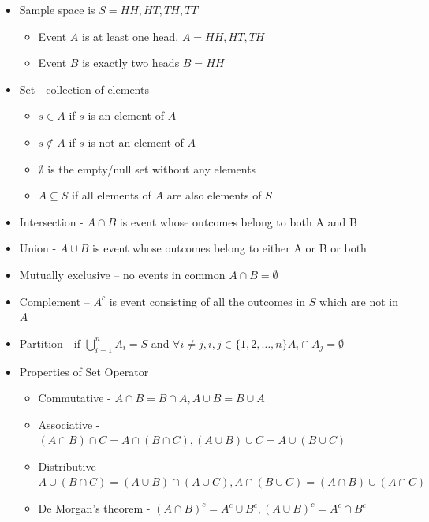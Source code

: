 \documentclass{article}
\begin{document}
\begin{itemize}
\begin{itemize}
        \item Any individual outcome, any subset of or the entire sample space
	   \item Said to occur if the realized outcome of the experiment is in A
    \end{itemize}
    \item Sample space is $S={HH,HT,TH,TT}$
    \begin{itemize}
        \item Event $A$ is at least one head, $A={HH,HT,TH}$
	   \item Event $B$ is exactly two heads $B={HH}$
    \end{itemize}
    \item Set - collection of elements
    \begin{itemize}
        \item $s \in A$ if $s$ is an element of $A$
        \item $s \notin A$ if $s$ is not an element of $A$
        \item $\emptyset$ is the empty/null set without any elements
        \item $A \subseteq S$ if all elements of $A$ are also elements of $S$
    \end{itemize}
    \item Intersection - $A \cap B$ is event whose outcomes belong to both A and B
    \item Union - $A \cup B$ is event whose outcomes belong to either A or B or both
    \item Mutually exclusive – no events in common $A \cap B=\emptyset$
    \item Complement – $A^c$ is event consisting of all the outcomes in $S$ which are not in $A$
    \item Partition - if $\bigcup_{i=1}^n A_i=S$ and $\forall i\neq j, i,j \in \{ 1,2, \dots , n \} A_i \cap A_j = \emptyset$
    \item Properties of Set Operator
    \begin{itemize}
        \item Commutative - $A \cap B = B \cap A, A \cup B = B \cup A$
        \item Associative - $(A \cap B)\cap C = A \cap (B \cap C), (A \cup B) \cup C = A \cup (B \cup C)$
        \item Distributive - $A \cup (B \cap C) = (A \cup B) \cap (A \cup C), A \cap (B \cup C) = (A \cap B) \cup (A \cap C)$
        \item De Morgan's theorem - $(A \cap B)^c = A^c \cup B^c, (A \cup B)^c = A^c \cap B^c$

\end{itemize}
\end{itemize}
\end{document}
